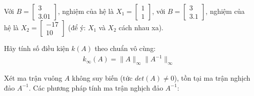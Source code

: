 \documentclass[12pt]{article}
\begin{document}
Với $B=\begin{bmatrix}  3 \\ 3.01 \end{bmatrix}$, nghiệm của hệ là $X_1=\begin{bmatrix}  1 \\ 1 \end{bmatrix}$, với $B=\begin{bmatrix}  3 \\ 3.1 \end{bmatrix}$, nghiệm của hệ là $X_2=\begin{bmatrix}  -17 \\ 10 \end{bmatrix}$ (để ý: $X_1$ và $X_2$ cách nhau xa).

Hãy tính số điều kiện $k(A)$ theo chuẩn vô cùng:
\begin{align*}
k_\infty(A)=\|A\|_\infty \|A^{-1}\|_\infty 
\end{align*}

\newpage{}

Xét ma trận vuông $A$ không suy biến (tức $det(A) \neq 0$), tồn tại ma trận nghịch đảo $A^{-1}$. Các phương pháp tính ma trận nghịch đảo $A^{-1}$:

\newpage{}
\end{document}
